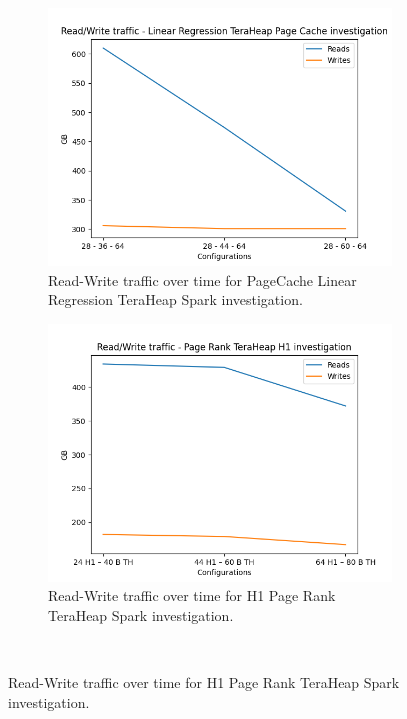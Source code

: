 \begin{figure}[htbp]
\begin{subfigure}[b]{0.48\textwidth}
    \includegraphics[width=\linewidth]{./fig/rw_linr_pc_th.png}
    \caption{Read-Write traffic over time for PageCache Linear
    Regression TeraHeap Spark investigation.}
    \label{fig:rw_linr_pc_th}
\end{subfigure}

	\begin{subfigure}[b]{0.48\textwidth}
    \includegraphics[width=\linewidth]{./fig/rw_pr_h1_th.png}
    \caption{Read-Write traffic over time for H1 Page Rank TeraHeap
    Spark investigation.}
    \label{fig:rw_pr_h1_th}
	\end{subfigure}\\[1em]
\end{figure}

